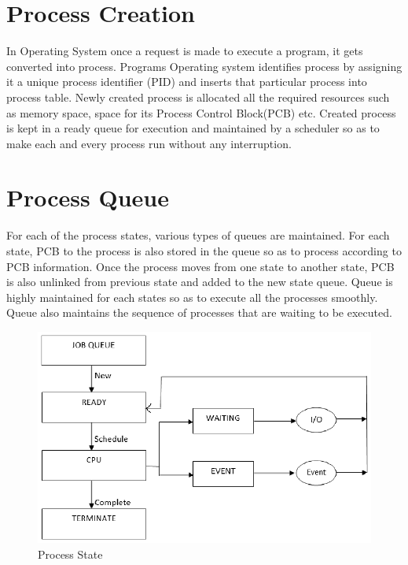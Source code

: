 \begin{onehalfspacing}
\section{Process Creation}
In Operating System once a request is made to execute a program, it gets converted into process. Programs Operating system identifies process by assigning it a unique process identifier (PID) and inserts that particular process into process table. Newly created process is allocated all the required resources such as memory space, space for its Process Control Block(PCB) etc. Created process is kept in a ready queue for execution and maintained by a scheduler so as to make each and every process run without any interruption. 
\newpage
\section{Process Queue}
For each of the process states, various types of queues are maintained. For each state, PCB to the process is also stored in the queue so as to process according to PCB information. Once the process moves from one state to another state, PCB is also unlinked from previous state and added to the new state queue. Queue is highly maintained for each states so as to execute all the processes smoothly. Queue also maintains the sequence of processes that are waiting to be executed.
\begin{figure}[h]
    \centering
    \includegraphics[width=15cm]{./proess_queue.eps}
    \caption{Process State}
    \label{fig:my_label}
\end{figure}









\end{onehalfspacing}
